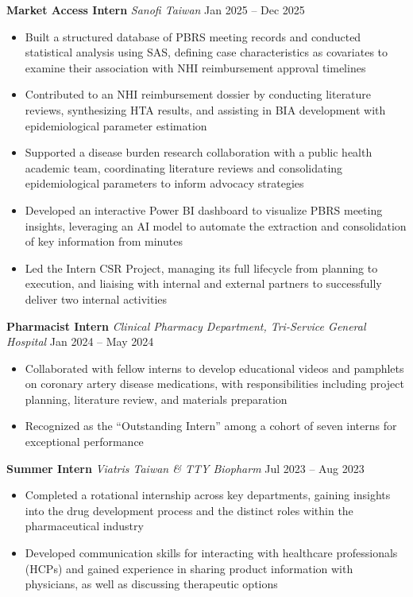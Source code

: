 \documentclass[10pt,a4paper]{article}
\newcommand{\entry}[3]{%
    \noindent\textbf{#1} \textbar{} \textit{#3} \hfill #2%
}
\begin{document}
\vspace{0.4em}

\entry{Market Access Intern}{Jan 2025 -- Dec 2025}{Sanofi Taiwan}
\begin{itemize}
    \item Built a structured database of PBRS meeting records and conducted statistical analysis using SAS, defining case characteristics as covariates to examine their association with NHI reimbursement approval timelines
    \item Contributed to an NHI reimbursement dossier by conducting literature reviews, synthesizing HTA results, and assisting in BIA development with epidemiological parameter estimation
    \item Supported a disease burden research collaboration with a public health academic team, coordinating literature reviews and consolidating epidemiological parameters to inform advocacy strategies
    \item Developed an interactive Power BI dashboard to visualize PBRS meeting insights, leveraging an AI model to automate the extraction and consolidation of key information from minutes
    \item Led the Intern CSR Project, managing its full lifecycle from planning to execution, and liaising with internal and external partners to successfully deliver two internal activities
\end{itemize}

\vspace{0.4em}

\entry{Pharmacist Intern}{Jan 2024 -- May 2024}{Clinical Pharmacy Department, Tri-Service General Hospital}
\begin{itemize}
    \item Collaborated with fellow interns to develop educational videos and pamphlets on coronary artery disease medications, with responsibilities including project planning, literature review, and materials preparation
    \item Recognized as the ``Outstanding Intern'' among a cohort of seven interns for exceptional performance
\end{itemize}

\vspace{0.4em}

\entry{Summer Intern}{Jul 2023 -- Aug 2023}{Viatris Taiwan \& TTY Biopharm}
\begin{itemize}
    \item Completed a rotational internship across key departments, gaining insights into the drug development process and the distinct roles within the pharmaceutical industry
    \item Developed communication skills for interacting with healthcare professionals (HCPs) and gained experience in sharing product information with physicians, as well as discussing therapeutic options
\end{itemize}
\end{document}
